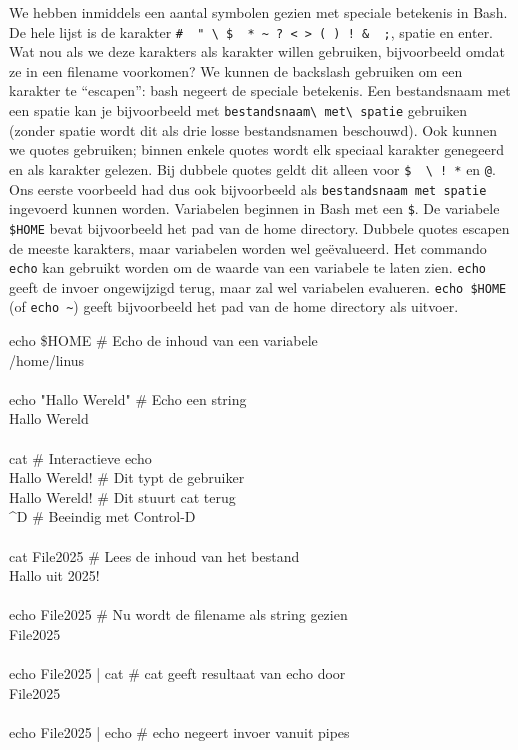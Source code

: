 We hebben inmiddels een aantal symbolen gezien met speciale betekenis in Bash. De hele lijst is de karakter \texttt{\#\ \textquotesingle{}\ "\ \textbackslash{}\ \$\ \textasciigrave{}\ *\ \textasciitilde\ ?\ \textless{}\ \textgreater{}\ (\ )\ !\ \&\ \textbar{}\ ;}, spatie en enter. Wat nou als we deze karakters als karakter willen gebruiken, bijvoorbeeld omdat ze in een filename voorkomen? We kunnen de backslash gebruiken om een karakter te ``escapen'': bash negeert de speciale betekenis. Een bestandsnaam met een spatie kan je bijvoorbeeld met \texttt{bestandsnaam\textbackslash{}\ met\textbackslash{}\ spatie} gebruiken (zonder spatie wordt dit als drie losse bestandsnamen beschouwd). Ook kunnen we quotes gebruiken; binnen enkele quotes wordt elk speciaal karakter genegeerd en als karakter gelezen. Bij dubbele quotes geldt dit alleen voor \texttt{\$\ \textasciigrave{}\ \textbackslash{}\ !\ *} en \texttt{@}. Ons eerste voorbeeld had dus ook bijvoorbeeld als \texttt{\textquotesingle{}bestandsnaam\ met\ spatie\textquotesingle{}} ingevoerd kunnen worden. Variabelen beginnen in Bash met een \texttt{\$}. De variabele \texttt{\$HOME} bevat bijvoorbeeld het pad van de home directory. Dubbele quotes escapen de meeste karakters, maar variabelen worden wel geëvalueerd. Het commando \texttt{echo} kan gebruikt worden om de waarde van een variabele te laten zien. \texttt{echo} geeft de invoer ongewijzigd terug, maar zal wel variabelen evalueren. \texttt{echo\ \$HOME} (of \texttt{echo\ \textasciitilde}) geeft bijvoorbeeld het pad van de home directory als uitvoer.

\begin{bash}
\p echo  \$HOME             \# Echo de inhoud van een variabele\\
/home/linus\\
\\
\p echo "Hallo Wereld"     \# Echo een string\\
Hallo Wereld\\
\\
\p cat                     \# Interactieve echo\\
Hallo Wereld!                                \# Dit typt de gebruiker\\
Hallo Wereld!                                \# Dit stuurt cat terug\\
\textasciicircum D                                           \# Beeindig met Control-D\\
\\
\p cat File2025            \# Lees de inhoud van het bestand\\
Hallo uit 2025!\\
\\
\p echo File2025           \# Nu wordt de filename als string gezien\\
File2025\\
\\
\p echo File2025 | cat     \# cat geeft resultaat van echo door\\
File2025\\
\\
\p echo File2025 | echo    \# echo negeert invoer vanuit pipes\\
\end{bash}

